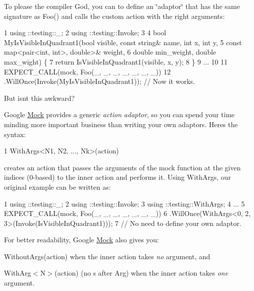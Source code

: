 To please the compiler God, you can to define an \char`\"{}adaptor\char`\"{} that has the same signature as {\ttfamily Foo()} and calls the custom action with the right arguments\+:


\begin{DoxyCode}
1 using ::testing::\_;
2 using ::testing::Invoke;
3 
4 bool MyIsVisibleInQuadrant1(bool visible, const string& name, int x, int y,
5                             const map<pair<int, int>, double>& weight,
6                             double min\_weight, double max\_wight) \{
7   return IsVisibleInQuadrant1(visible, x, y);
8 \}
9 ...
10 
11   EXPECT\_CALL(mock, Foo(\_, \_, \_, \_, \_, \_, \_))
12       .WillOnce(Invoke(MyIsVisibleInQuadrant1));  // Now it works.
\end{DoxyCode}


But isn\textquotesingle{}t this awkward?

Google \hyperlink{class_mock}{Mock} provides a generic {\itshape action adaptor}, so you can spend your time minding more important business than writing your own adaptors. Here\textquotesingle{}s the syntax\+:


\begin{DoxyCode}
1 WithArgs<N1, N2, ..., Nk>(action)
\end{DoxyCode}


creates an action that passes the arguments of the mock function at the given indices (0-\/based) to the inner {\ttfamily action} and performs it. Using {\ttfamily With\+Args}, our original example can be written as\+:


\begin{DoxyCode}
1 using ::testing::\_;
2 using ::testing::Invoke;
3 using ::testing::WithArgs;
4 ...
5   EXPECT\_CALL(mock, Foo(\_, \_, \_, \_, \_, \_, \_))
6       .WillOnce(WithArgs<0, 2, 3>(Invoke(IsVisibleInQuadrant1)));
7       // No need to define your own adaptor.
\end{DoxyCode}


For better readability, Google \hyperlink{class_mock}{Mock} also gives you\+:


\begin{DoxyItemize}
\item {\ttfamily Without\+Args(action)} when the inner {\ttfamily action} takes {\itshape no} argument, and
\item {\ttfamily With\+Arg$<$N$>$(action)} (no {\ttfamily s} after {\ttfamily Arg}) when the inner {\ttfamily action} takes {\itshape one} argument.
\end{DoxyItemize}

